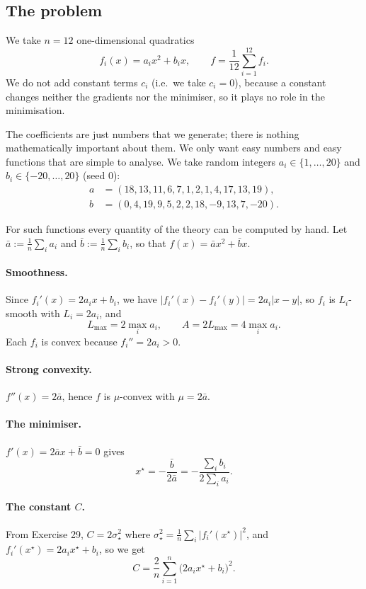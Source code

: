 \documentclass[11pt,a4paper]{article}
\newcommand{\xs}{x^\star}
\begin{document}
\subsection*{The problem}
We take $n = 12$ one-dimensional quadratics
\[
  f_i(x) = a_i x^2 + b_i x, \qquad f = \frac{1}{12}\sum_{i=1}^{12} f_i .
\]
We do not add constant terms $c_i$ (i.e.\ we take $c_i = 0$), because a constant changes neither
the gradients nor the minimiser, so it plays no role in the minimisation.

The coefficients are just numbers that we generate; there is nothing mathematically important
about them. We only want easy numbers and easy functions that are simple to analyse. We take
random integers $a_i \in \{1,\dots,20\}$ and $b_i \in \{-20,\dots,20\}$ (seed $0$):
\begin{align*}
  a &= (18, 13, 11, 6, 7, 1, 2, 1, 4, 17, 13, 19), \\
  b &= (0, 4, 19, 9, 5, 2, 2, 18, -9, 13, 7, -20).
\end{align*}

For such functions every quantity of the theory can be computed by hand. Let
$\bar a := \frac{1}{n}\sum_i a_i$ and $\bar b := \frac{1}{n}\sum_i b_i$, so that
$f(x) = \bar a x^2 + \bar b x$.

\paragraph{Smoothness.} Since $f_i'(x) = 2a_i x + b_i$, we have
$|f_i'(x) - f_i'(y)| = 2a_i|x-y|$, so $f_i$ is $L_i$-smooth with $L_i = 2a_i$, and
\[
  L_{\max} = 2\max_i a_i, \qquad A = 2L_{\max} = 4\max_i a_i .
\]
Each $f_i$ is convex because $f_i'' = 2a_i > 0$.

\paragraph{Strong convexity.} $f''(x) = 2\bar a$, hence $f$ is $\mu$-convex with $\mu = 2\bar a$.

\paragraph{The minimiser.} $f'(x) = 2\bar a x + \bar b = 0$ gives
\[
  \xs = -\frac{\bar b}{2\bar a} = -\frac{\sum_i b_i}{2\sum_i a_i} .
\]

\paragraph{The constant $C$.} From Exercise 29, $C = 2\sigma_\star^2$ where
$\sigma_\star^2 = \frac{1}{n}\sum_i |f_i'(\xs)|^2$, and $f_i'(\xs) = 2a_i\xs + b_i$, so we get
\[
  C = \frac{2}{n}\sum_{i=1}^n \bigl(2a_i\xs + b_i\bigr)^2 .
\]
\end{document}
